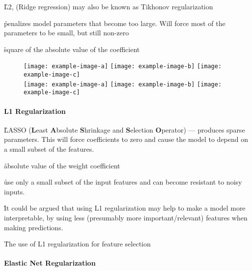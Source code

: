 
\r{L2, ({Ridge regression}) may also be known as {Tikhonov regularization}}

\r{penalizes model parameters that become too large. Will force most of the parameters to be small, but still non-zero}

\r{square of the absolute value of the coefficient}

\begin{figure}[htp]
	\centering
	\texttt{[image: example-image-a]}\hfil
	\texttt{[image: example-image-b]}\hfil
	\texttt{[image: example-image-c]}\hfil\\
	\medskip
	\texttt{[image: example-image-a]}\hfil
	\texttt{[image: example-image-b]}\hfil
	\texttt{[image: example-image-c]}\hfil
	\caption{}
	\label{fig:basics_regularization_l2_example}
\end{figure}



\paragraph{L1 Regularization}


\r{LASSO (\textbf{L}east \textbf{A}bsolute \textbf{S}hrinkage and \textbf{S}election \textbf{O}perator) --- produces sparse parameters. This will force coefficients to zero and cause the model to depend on a small subset of the features.}

\r{absolute value of the weight coefficient}

\r{use only a small subset of the input features and can become resistant to noisy inputs.}

\r{It could be argued that using L1 regularization may help to make a model more interpretable, by using less (presumably more important/relevant) features when making predictions.}

\r{The use of L1 regularization for feature selection}


\paragraph{Elastic Net Regularization}

